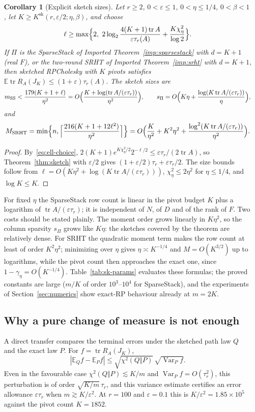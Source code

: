\documentclass[11pt]{article}
\newtheorem{corollary}[theorem]{Corollary}
\theoremstyle{definition}\newtheorem{definition}[theorem]{Definition}
\theoremstyle{remark}\newtheorem{remark}[theorem]{Remark}
\newcommand{\E}{\mathbb E}
\newcommand{\eps}{\varepsilon}
\newcommand{\tr}{\operatorname{tr}}
\newcommand{\1}{\mathbf 1}
\begin{document}
\begin{corollary}[Explicit sketch sizes]\label{cor:instances}
Let $r\ge2$, $0<\eps\le1$, $0<\eta\le1/4$, $0<\beta<1$, let
$K\ge K^{\mathrm{sk}}(r,\eps/2;\eta,\beta)$, and choose
\begin{equation}\label{eq:ell-choice}
 \ell\ge\max\Bigl\{2,\ 2\log_2\frac{4(K+1)\tr A}{\eps\tau_r(A)}
 +\frac{K\chi^2_\eta}{\log2}\Bigr\}.
\end{equation}
If $\Pi$ is the SparseStack of Imported Theorem~\ref{imp:sparsestack}
with $d=K+1$ (real $F$), or the two-round SRHT of Imported
Theorem~\ref{imp:srht} with $d=K+1$, then sketched RPCholesky with $K$
pivots satisfies $\E\tr R_A(J_K)\le(1+\eps)\tau_r(A)$. The sketch sizes
are
\[
 m_{\mathrm{SS}}<\frac{179(K+1+\ell)}{\eta^2}
 =O\Bigl(\frac{K+\log(\tr A/(\eps\tau_r))}{\eta^2}\Bigr),\qquad
 s_\Pi=O\Bigl(K\eta+\frac{\log(K\tr A/(\eps\tau_r))}\eta\Bigr),
\]
and
\[
 M_{\mathrm{SRHT}}=\min\Bigl\{n,\Bigl\lceil\frac{216(K+1+12\ell^2)}{\eta^2}\Bigr\rceil\Bigr\}
 =O\Bigl(\frac K{\eta^2}+K^2\eta^2
 +\frac{\log^2(K\tr A/(\eps\tau_r))}{\eta^2}\Bigr).
\]
\end{corollary}
\begin{proof}
By~\eqref{eq:ell-choice},
$2(K+1)e^{K\chi^2_\eta/2}2^{-\ell/2}\le\eps\tau_r/(2\tr A)$, so
Theorem~\ref{thm:sketch} with $\eps/2$ gives
$(1+\eps/2)\tau_r+\eps\tau_r/2$. The size bounds follow from
$\ell=O(K\eta^2+\log(K\tr A/(\eps\tau_r)))$, $\chi^2_\eta\le2\eta^2$ for
$\eta\le1/4$, and $\log K\le K$.
\end{proof}

For fixed $\eta$ the SparseStack row count is linear in the pivot budget
$K$ plus a logarithm of $\tr A/(\eps\tau_r)$; it is independent of $N$,
of $D$ and of the rank of $F$. Two costs should be stated plainly. The
moment order grows linearly in $K\eta^2$, so the column sparsity
$s_\Pi$ grows like $K\eta$: the sketches covered by the theorem are
relatively dense. For SRHT the quadratic moment term makes the row count
at least of order $K^2\eta^2$; minimizing over $\eta$ gives
$\eta\asymp K^{-1/4}$ and $M=O(K^{3/2})$ up to logarithms, while the
pivot count then approaches the exact one, since
$1-\gamma_\eta=O(K^{-1/4})$. Table~\ref{tab:sk-params} evaluates these
formulas; the proved constants are large ($m/K$ of order $10^3$--$10^4$
for SparseStack), and the experiments of Section~\ref{sec:numerics}
show exact-RP behaviour already at $m=2K$.

\subsection{Why a pure change of measure is not enough}\label{sec:chi-only}
A direct transfer compares the terminal errors under the sketched path
law $Q$ and the exact law $P$. For $f=\tr R_A(J_K)$,
\[
 |\E_Qf-\E_Pf|\le\sqrt{\chi^2(Q\Vert P)}\,\sqrt{\operatorname{Var}_Pf}.
\]
Even in the favourable case $\chi^2(Q\Vert P)\lesssim K/m$ and
$\operatorname{Var}_Pf=O(\tau_r^2)$, this perturbation is of order
$\sqrt{K/m}\,\tau_r$, and this variance estimate certifies an error
allowance $\eps\tau_r$ when
$m\gtrsim K/\eps^2$. At $r=100$ and $\eps=0.1$ this is
$K/\eps^2=1.85\times10^5$ against the pivot count $K=1852$.
\end{document}
